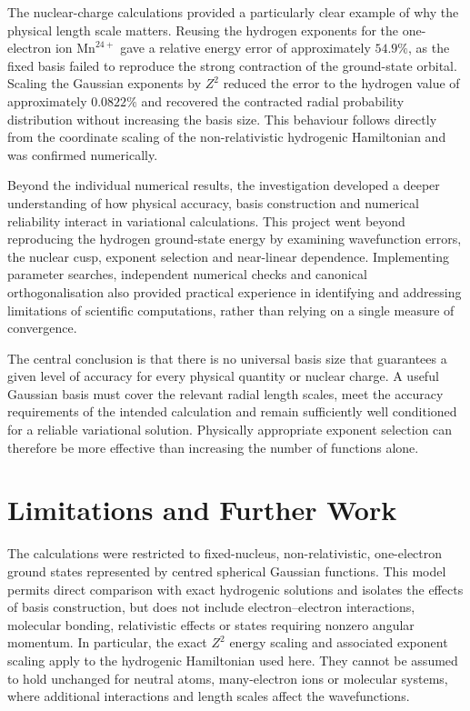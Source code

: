 The nuclear-charge calculations provided a particularly clear example of why the physical length scale matters. Reusing the hydrogen exponents for the one-electron ion $\mathrm{Mn}^{24+}$ gave a relative energy error of approximately $54.9\%$, as the fixed basis failed to reproduce the strong contraction of the ground-state orbital. Scaling the Gaussian exponents by $Z^2$ reduced the error to the hydrogen value of approximately $0.0822\%$ and recovered the contracted radial probability distribution without increasing the basis size. This behaviour follows directly from the coordinate scaling of the non-relativistic hydrogenic Hamiltonian and was confirmed numerically.

Beyond the individual numerical results, the investigation developed a deeper understanding of how physical accuracy, basis construction and numerical reliability interact in variational calculations. This project went beyond reproducing the hydrogen ground-state energy by examining wavefunction errors, the nuclear cusp, exponent selection and near-linear dependence. Implementing parameter searches, independent numerical checks and canonical orthogonalisation also provided practical experience in identifying and addressing limitations of scientific computations, rather than relying on a single measure of convergence.

The central conclusion is that there is no universal basis size that guarantees a given level of accuracy for every physical quantity or nuclear charge. A useful Gaussian basis must cover the relevant radial length scales, meet the accuracy requirements of the intended calculation and remain sufficiently well conditioned for a reliable variational solution. Physically appropriate exponent selection can therefore be more effective than increasing the number of functions alone.



\section{Limitations and Further Work}

The calculations were restricted to fixed-nucleus, non-relativistic, one-electron ground states represented by centred spherical Gaussian functions. This model permits direct comparison with exact hydrogenic solutions and isolates the effects of basis construction, but does not include electron--electron interactions, molecular bonding, relativistic effects or states requiring nonzero angular momentum. In particular, the exact $Z^2$ energy scaling and associated exponent scaling apply to the hydrogenic Hamiltonian used here. They cannot be assumed to hold unchanged for neutral atoms, many-electron ions or molecular systems, where additional interactions and length scales affect the wavefunctions.

